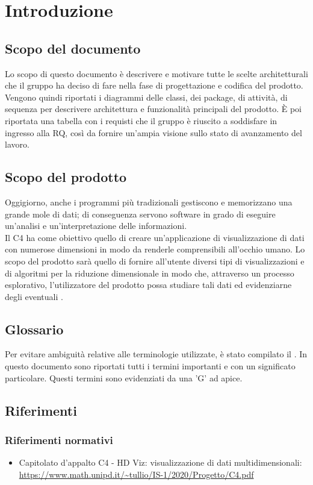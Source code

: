 \section{Introduzione}
\subsection{Scopo del documento}
Lo scopo di questo documento è descrivere e motivare tutte le scelte architetturali che il gruppo \Gruppo{} ha deciso di fare nella fase di progettazione e codifica del prodotto. Vengono quindi riportati i diagrammi delle classi, dei package, di attività, di sequenza per descrivere architettura e funzionalità principali del prodotto.
È poi riportata una tabella con i requisti che il gruppo è riuscito a soddisfare in ingresso alla RQ, così da fornire un'ampia visione sullo stato di avanzamento del lavoro.

\subsection{Scopo del prodotto}
Oggigiorno, anche i programmi più tradizionali gestiscono e memorizzano una grande mole di dati; di conseguenza servono software in grado di eseguire un'analisi e un'interpretazione delle informazioni.\\
Il  C4 ha come obiettivo quello di creare un'applicazione di visualizzazione di dati con numerose dimensioni in modo da renderle comprensibili all'occhio umano.  Lo scopo del prodotto sarà quello di fornire all'utente diversi tipi di visualizzazioni e di algoritmi per la riduzione dimensionale in modo che, attraverso un processo esplorativo, l'utilizzatore del prodotto possa studiare tali dati ed evidenziarne degli eventuali .
\subsection{Glossario}
Per evitare ambiguità relative alle terminologie utilizzate, è stato compilato il . In questo documento sono riportati tutti i termini importanti e con un significato particolare. Questi termini sono evidenziati da una 'G' ad apice.

\subsection{Riferimenti}
\subsubsection{Riferimenti normativi}
\begin{itemize}
	\item	Capitolato d'appalto C4 - HD Viz: visualizzazione di dati multidimensionali: \\
	\textcolor{blue}{\url{https://www.math.unipd.it/~tullio/IS-1/2020/Progetto/C4.pdf}}
\end{itemize}

